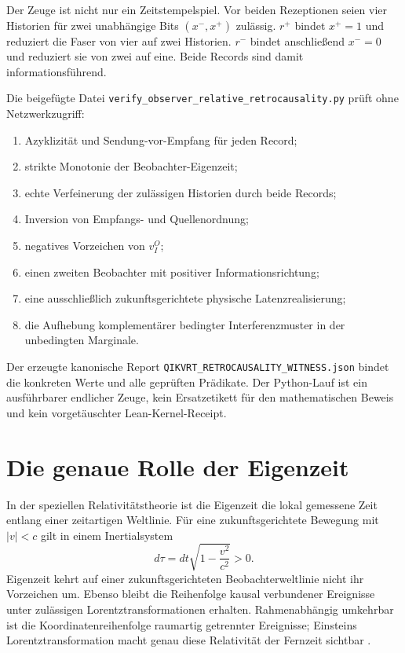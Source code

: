 \documentclass[11pt,a4paper]{article}
\theoremstyle{remark}
\begin{document}
Der Zeuge ist nicht nur ein Zeitstempelspiel. Vor beiden Rezeptionen seien
vier Historien für zwei unabhängige Bits \((x^-,x^+)\) zulässig. \(r^+\)
bindet \(x^+=1\) und reduziert die Faser von vier auf zwei Historien.
\(r^-\) bindet anschließend \(x^-=0\) und reduziert sie von zwei auf eine.
Beide Records sind damit informationsführend.

Die beigefügte Datei
\texttt{verify\_observer\_relative\_retrocausality.py} prüft ohne
Netzwerkzugriff:

\begin{enumerate}
  \item Azyklizität und Sendung-vor-Empfang für jeden Record;
  \item strikte Monotonie der Beobachter-Eigenzeit;
  \item echte Verfeinerung der zulässigen Historien durch beide Records;
  \item Inversion von Empfangs- und Quellenordnung;
  \item negatives Vorzeichen von \(v_I^O\);
  \item einen zweiten Beobachter mit positiver Informationsrichtung;
  \item eine ausschließlich zukunftsgerichtete physische Latenzrealisierung;
  \item die Aufhebung komplementärer bedingter Interferenzmuster in der
  unbedingten Marginale.
\end{enumerate}

Der erzeugte kanonische Report
\texttt{QIKVRT\_RETROCAUSALITY\_WITNESS.json} bindet die konkreten Werte und
alle geprüften Prädikate. Der Python-Lauf ist ein ausführbarer endlicher
Zeuge, kein Ersatzetikett für den mathematischen Beweis und kein vorgetäuschter
Lean-Kernel-Receipt.

\section{Die genaue Rolle der Eigenzeit}

In der speziellen Relativitätstheorie ist die Eigenzeit die lokal gemessene
Zeit entlang einer zeitartigen Weltlinie. Für eine zukunftsgerichtete Bewegung
mit \(|v|<c\) gilt in einem Inertialsystem
\[
  d\tau=dt\sqrt{1-\frac{v^2}{c^2}}>0.
\]
Eigenzeit kehrt auf einer zukunftsgerichteten Beobachterweltlinie nicht ihr
Vorzeichen um. Ebenso bleibt die Reihenfolge kausal verbundener Ereignisse
unter zulässigen Lorentztransformationen erhalten. Rahmenabhängig umkehrbar
ist die Koordinatenreihenfolge raumartig getrennter Ereignisse; Einsteins
Lorentztransformation macht genau diese Relativität der Fernzeit sichtbar
\cite{Einstein1905,Minkowski1909}.
\end{document}
